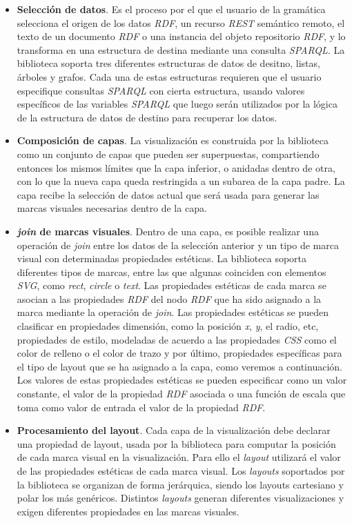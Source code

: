 \begin{itemize}
\item \textbf{Selecci\'on de datos}. Es el proceso por el que el usuario de la gram\'atica selecciona el origen de los datos \textit{RDF}, un recurso \textit{REST} sem\'antico remoto, el texto de un documento \textit{RDF} o una instancia del objeto repositorio \textit{RDF}, y lo transforma en una estructura de destina mediante una consulta \textit{SPARQL}. La biblioteca soporta tres diferentes estructuras de datos de desitno, listas, \'arboles y grafos. Cada una de estas estructuras requieren que el usuario especifique consultas \textit{SPARQL} con cierta estructura, usando valores espec\'ificos de las variables \textit{SPARQL} que luego ser\'an utilizados por la l\'ogica de la estructura de datos de destino para recuperar los datos.
\item \textbf{Composici\'on de capas}. La visualizaci\'on es construida por la biblioteca como un conjunto de capas que pueden ser superpuestas, compartiendo entonces los mismos l\'imites que la capa inferior,  o anidadas dentro de otra, con lo que la nueva capa queda restringida a un subarea de la capa padre. La capa recibe la selecci\'on de datos actual que ser\'a usada para generar las marcas visuales necesarias dentro de la capa.
\item \textbf{\textit{join} de marcas visuales}. Dentro de una capa, es posible realizar una operaci\'on de \textit{join} entre  los datos de la selecci\'on anterior y un tipo de marca visual con determinadas propiedades est\'eticas. La biblioteca soporta diferentes tipos de marcas, entre las que algunas coinciden con elementos \textit{SVG}, como \textit{rect}, \textit{circle} o \textit{text}. Las propiedades est\'eticas de cada marca se asocian a las propiedades \textit{RDF} del nodo \textit{RDF} que ha sido asignado a la marca mediante la operaci\'on de \textit{join}. Las propiedades est\'eticas se pueden clasificar en propiedades dimensi\'on, como la posici\'on \textit{x}, \textit{y}, el radio, etc, propiedades de estilo, modeladas de acuerdo a las propiedades \textit{CSS} como el color de relleno o el color de trazo y por \'ultimo, propiedades espec\'ificas para el tipo de layout que se ha asignado a la capa, como veremos a continuaci\'on. Los valores de estas propiedades est\'eticas se pueden especificar como un valor constante, el valor de la propiedad \textit{RDF} asociada o una funci\'on de escala que toma como valor de entrada el valor de la propiedad \textit{RDF}.
\item \textbf{Procesamiento del layout}. Cada capa de la visualizaci\'on debe declarar una propiedad de layout, usada por la biblioteca para computar la posici\'on de cada marca visual en la visualizaci\'on. Para ello el \textit{layout} utilizar\'a el valor de las propiedades est\'eticas de cada marca visual. Los \textit{layouts} soportados por la biblioteca se organizan de forma jer\'arquica, siendo los layouts cartesiano y polar los m\'as gen\'ericos. Distintos \textit{layouts} generan diferentes visualizaciones y exigen diferentes propiedades en las marcas visuales.
\end{itemize}

